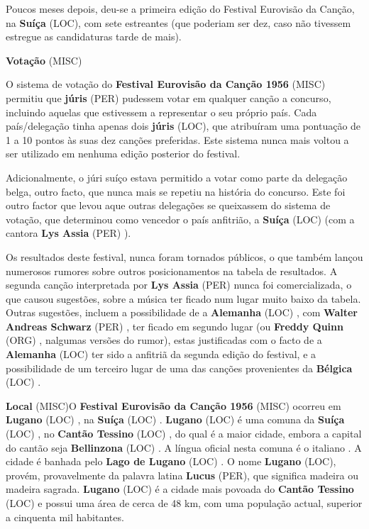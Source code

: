 \documentclass[12pt,a4paper]{article}
\begin{document}
Poucos meses depois, deu-se a primeira edição do Festival Eurovisão da Canção, na \textbf{Suíça} (LOC), com sete estreantes (que poderiam ser dez, caso não tivessem estregue as candidaturas tarde de mais).



\textbf{Votação} (MISC)

O sistema de votação do \textbf{Festival Eurovisão da Canção 1956} (MISC) permitiu que \textbf{júris} (PER) pudessem votar em qualquer canção a concurso, incluindo aquelas que estivessem a representar o seu próprio país. Cada país/delegação tinha apenas dois \textbf{júris} (LOC), que atribuíram uma pontuação de 1 a 10 pontos às suas dez canções preferidas. Este sistema nunca mais voltou a ser utilizado em nenhuma edição posterior do festival.

Adicionalmente, o júri suíço estava permitido a votar como parte da delegação belga, outro facto, que nunca mais se repetiu na história do concurso. Este foi outro factor que levou aque outras delegações se queixassem do sistema de votação, que determinou como vencedor o país anfitrião, a \textbf{Suíça} (LOC) (com a cantora \textbf{Lys Assia} (PER) ).

Os resultados deste festival, nunca foram tornados públicos, o que também lançou numerosos rumores sobre outros posicionamentos na tabela de resultados. A segunda canção interpretada por \textbf{Lys Assia} (PER) nunca foi comercializada, o que causou sugestões, sobre a música ter ficado num lugar muito baixo da tabela. Outras sugestões, incluem a possibilidade de a \textbf{Alemanha} (LOC) , com \textbf{Walter Andreas Schwarz} (PER) , ter ficado em segundo lugar (ou \textbf{Freddy Quinn} (ORG) , nalgumas versões do rumor), estas justificadas com o facto de a \textbf{Alemanha} (LOC) ter sido a anfitriã da segunda edição do festival, e a possibilidade de um terceiro lugar de uma das canções provenientes da \textbf{Bélgica} (LOC) .



\textbf{Local} (MISC)O \textbf{Festival Eurovisão da Canção 1956} (MISC) ocorreu em \textbf{Lugano} (LOC) , na \textbf{Suíça} (LOC) . \textbf{Lugano} (LOC) é uma comuna da \textbf{Suíça} (LOC) , no \textbf{Cantão Tessino} (LOC) , do qual é a maior cidade, embora a capital do cantão seja \textbf{Bellinzona} (LOC) . A língua oficial nesta comuna é o italiano . A cidade é banhada pelo \textbf{Lago de Lugano} (LOC) . O nome \textbf{Lugano} (LOC), provém, provavelmente da palavra latina \textbf{Lucus} (PER), que significa madeira ou madeira sagrada. \textbf{Lugano} (LOC) é a cidade mais povoada do \textbf{Cantão Tessino} (LOC) e possui uma área de cerca de 48 km, com uma população actual, superior a cinquenta mil habitantes.
\end{document}
